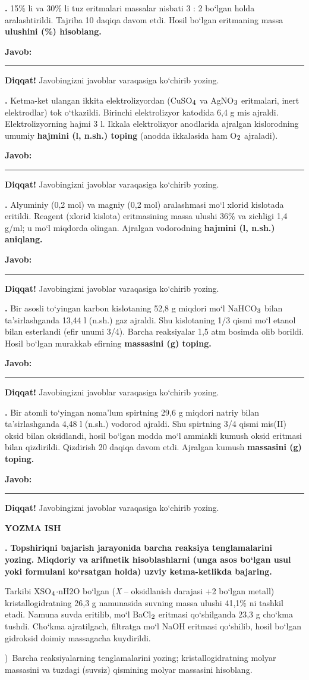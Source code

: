 \documentclass[11pt,a4paper]{article}
\renewcommand{\textsubscript}[1]{\ensuremath{_{\text{\fontsize{8}{8}\selectfont #1}}}}
\newcommand{\qn}[1]{\textbf{\fontsize{11.5}{13}\selectfont #1}}
\newcommand{\qsep}{\par\vspace{13pt}}
\newcommand{\javob}{\par\nopagebreak[4]\smallskip\noindent\textbf{Javob:} \rule[-2pt]{7.5cm}{0.4pt}\par\smallskip\noindent\textbf{Diqqat!} Javobingizni javoblar varaqasiga ko`chirib yozing.\par\medskip}
\begin{document}
\par\bigskip
\noindent\qn{36.} 15\% li va 30\% li tuz eritmalari massalar nisbati 3 : 2 bo`lgan holda aralashtirildi. Tajriba 10 daqiqa davom etdi. Hosil bo`lgan eritmaning massa \textbf{ulushini (\%) hisoblang.}
\javob\qsep
\noindent\qn{37.} Ketma-ket ulangan ikkita elektrolizyordan (CuSO\textsubscript{4} va AgNO\textsubscript{3} eritmalari, inert elektrodlar) tok o`tkazildi. Birinchi elektrolizyor katodida 6,4 g mis ajraldi. Elektrolizyorning hajmi 3 l. Ikkala elektrolizyor anodlarida ajralgan kislorodning umumiy \textbf{hajmini (l, n.sh.) toping} (anodda ikkalasida ham O\textsubscript{2} ajraladi).
\javob\qsep
\noindent\qn{38.} Alyuminiy (0,2 mol) va magniy (0,2 mol) aralashmasi mo`l xlorid kislotada eritildi. Reagent (xlorid kislota) eritmasining massa ulushi 36\% va zichligi 1,4 g/ml; u mo`l miqdorda olingan. Ajralgan vodorodning \textbf{hajmini (l, n.sh.) aniqlang.}
\javob\qsep
\noindent\qn{39.} Bir asosli to`yingan karbon kislotaning 52,8 g miqdori mo`l NaHCO\textsubscript{3} bilan ta'sirlashganda 13,44 l (n.sh.) gaz ajraldi. Shu kislotaning 1/3 qismi mo`l etanol bilan esterlandi (efir unumi 3/4). Barcha reaksiyalar 1,5 atm bosimda olib borildi. Hosil bo`lgan murakkab efirning \textbf{massasini (g) toping.}
\javob\qsep
\noindent\qn{40.} Bir atomli to`yingan noma'lum spirtning 29,6 g miqdori natriy bilan ta'sirlashganda 4,48 l (n.sh.) vodorod ajraldi. Shu spirtning 3/4 qismi mis(II) oksid bilan oksidlandi, hosil bo`lgan modda mo`l ammiakli kumush oksid eritmasi bilan qizdirildi. Qizdirish 20 daqiqa davom etdi. Ajralgan kumush \textbf{massasini (g) toping.}
\javob\qsep
\par\bigskip\begin{center}\textbf{\fontsize{13}{15}\selectfont YOZMA ISH}\end{center}
\noindent\qn{41.} \textbf{Topshiriqni bajarish jarayonida barcha reaksiya tenglamalarini yozing. Miqdoriy va arifmetik hisoblashlarni (unga asos bo`lgan usul yoki formulani ko`rsatgan holda) uzviy ketma-ketlikda bajaring.}\par\smallskip
Tarkibi XSO\textsubscript{4}$\cdot$nH2O bo`lgan (\textit{X} -- oksidlanish darajasi +2 bo`lgan metall) kristallogidratning 26,3 g namunasida suvning massa ulushi 41,1\% ni tashkil etadi. Namuna suvda eritilib, mo`l BaCl\textsubscript{2} eritmasi qo`shilganda 23,3 g cho`kma tushdi. Cho`kma ajratilgach, filtratga mo`l NaOH eritmasi qo`shilib, hosil bo`lgan gidroksid doimiy massagacha kuydirildi.\par
{})\ Barcha reaksiyalarning tenglamalarini yozing; kristallogidratning molyar massasini va tuzdagi (suvsiz) qismining molyar massasini hisoblang.\par
\end{document}
